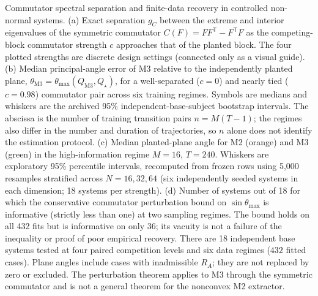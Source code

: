 \caption{Commutator spectral separation and finite-data recovery in controlled non-normal systems.
(a) Exact separation $g_C$ between the extreme and interior eigenvalues of the symmetric commutator $C(F)=FF^{\mathsf T}-F^{\mathsf T}F$ as the competing-block commutator strength $c$ approaches that of the planted block. The four plotted strengths are discrete design settings (connected only as a visual guide).
(b) Median principal-angle error of M3 relative to the independently planted plane, $\theta_{\mathrm{M3}}=\theta_{\max}(Q_{\mathrm{M3}},Q_\star)$, for a well-separated ($c=0$) and nearly tied ($c=0.98$) commutator pair across six training regimes. Symbols are medians and whiskers are the archived 95\% independent-base-subject bootstrap intervals. The abscissa is the number of training transition pairs $n=M(T-1)$; the regimes also differ in the number and duration of trajectories, so $n$ alone does not identify the estimation protocol.
(c) Median planted-plane angle for M2 (orange) and M3 (green) in the high-information regime $M=16$, $T=240$. Whiskers are exploratory 95\% percentile intervals, recomputed from frozen rows using 5,000 resamples stratified across $N=16,32,64$ (six independently seeded systems in each dimension; 18 systems per strength).
(d) Number of systems out of 18 for which the conservative commutator perturbation bound on $\sin\theta_{\max}$ is informative (strictly less than one) at two sampling regimes. The bound holds on all 432 fits but is informative on only 36; its vacuity is not a failure of the inequality or proof of poor empirical recovery.
There are 18 independent base systems tested at four paired competition levels and six data regimes ($432$ fitted cases). Plane angles include cases with inadmissible $R_A$; they are not replaced by zero or excluded. The perturbation theorem applies to M3 through the symmetric commutator and is not a general theorem for the nonconvex M2 extractor.}

